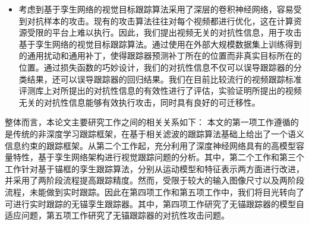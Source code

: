 \begin{itemize}
\item 考虑到基于孪生网络的视觉目标跟踪算法采用了深层的卷积神经网络，容易受到对抗样本的攻击。现有的攻击算法往往对每个视频都进行优化，这在计算资源受限的平台上难以执行。因此，我们提出视频无关的对抗性信息，用于攻击基于孪生网络的视觉目标跟踪算法。通过使用在外部大规模数据集上训练得到的通用扰动和通用补丁，使得跟踪器预测补丁所在的位置而非真实目标所在的位置。通过损失函数的巧妙设计，我们的对抗性信息不仅可以误导跟踪器的分类结果，还可以误导跟踪器的回归结果。我们在目前比较流行的视频跟踪标准评测库上对所提出的对抗性信息的有效性进行了评估，实验证明所提出的视频无关的对抗性信息能够有效执行攻击，同时具有良好的可迁移性。
\end{itemize}

整体而言，本论文主要研究工作之间的相关关系如下：
本文的第一项工作遵循的是传统的非深度学习跟踪框架，在基于相关滤波的跟踪算法基础上给出了一个语义信息约束的跟踪框架。从第二个工作起，充分利用了深度神经网络具有的高模型容量特性，基于孪生网络架构进行视觉跟踪问题的分析。其中，第二个工作和第三个工作针对基于锚框的孪生跟踪算法，分别从运动模型和特征表示两方面进行改进，并采用了两阶段流程提高跟踪精度。然而，受限于较大的输入图像尺寸以及两阶段流程，未能做到实时跟踪。因此在第四项工作和第五项工作中，我们将目光转向了可进行实时跟踪的无锚孪生跟踪器。其中，第四项工作研究了无锚跟踪器的模型自适应问题，第五项工作研究了无锚跟踪器的对抗性攻击问题。


